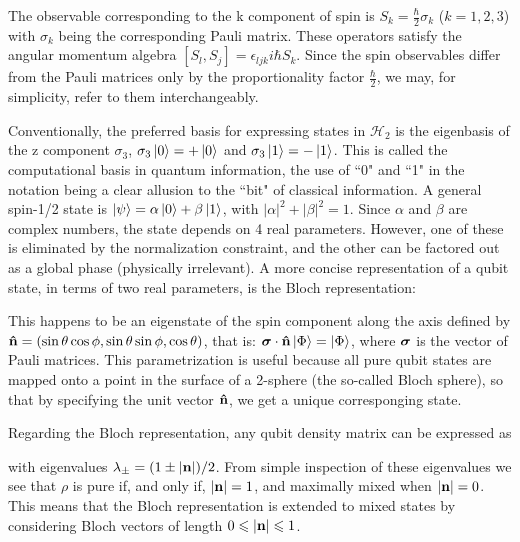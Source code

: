 \documentclass[12pt,a4paper,notitlepage]{report}
\begin{document}
The observable corresponding to the k component of spin is $S_k = \frac{\hbar}{2}\sigma_k$ ($k = 1, 2, 3$) with $\sigma_k$ being the corresponding Pauli matrix. These operators satisfy the angular momentum  algebra $\left[S_l, S_j \right] = \epsilon_{ljk}i\hbar S_k$. Since the spin observables differ from the Pauli matrices only by the proportionality factor $\frac{\hbar}{2}$, we may, for simplicity, refer to them interchangeably.

Conventionally, the preferred basis for expressing states in $\mathcal{H}_2$ is the eigenbasis of the z component $\sigma_3$, $\sigma_3\ket{0} = +\ket{0}$ and $\sigma_3\ket{1} = -\ket{1}$. This is called the computational basis in quantum information, the use of ``0" and ``1" in the notation being a clear allusion to the ``bit" of classical information. A general spin-1/2 state is $\ket{\psi} = \alpha\ket{0} + \beta\ket{1}$, with $\left|\alpha\right|^2 + \left|\beta\right|^2 = 1$. Since $\alpha$ and $\beta$ are complex numbers, the state depends on 4 real parameters. However, one of these is eliminated by the normalization constraint, and the other can be factored out as a global phase (physically irrelevant). A more concise representation of a qubit state, in terms of two real parameters, is the Bloch representation:

%
This happens to be an eigenstate of the spin component along the axis defined by \linebreak $\vu{n} = (\sin\theta\cos\phi, \sin\theta\sin\phi, \cos\theta)$, that is: $\vb*{\sigma}\cdot\vu{n}\ket{\Phi} = \ket{\Phi}$, where $\vb*{\sigma}$ is the vector of Pauli matrices. This parametrization is useful because all pure qubit states are mapped onto a point in the surface of a 2-sphere (the so-called Bloch sphere), so that by specifying the unit vector $\vu{n}$, we get a unique corresponging state.

Regarding the Bloch representation, any qubit density matrix can be expressed as 

%
with eigenvalues $\lambda_{\pm} = (1\pm|\vb{n}|)/2$. From simple inspection of these eigenvalues we see that $\rho$ is pure if, and only if, $|\vb{n}| = 1$, and maximally mixed when $|\vb{n}| = 0$. This means that the Bloch representation is extended to mixed states by considering Bloch vectors of length $0 \leqslant |\vb{n}| \leqslant 1$.
\end{document}

